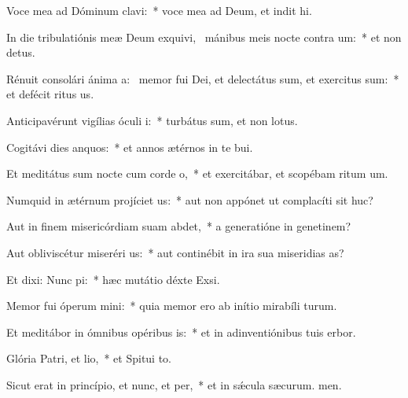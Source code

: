 \item Voce mea ad Dóminum clavi:~* voce mea ad Deum, et indit hi.
\item In die tribulatiónis meæ Deum exquivi,~\pscross{} mánibus meis nocte contra um:~* et non  detus.
\item Rénuit consolári ánima a:~\pscross{} memor fui Dei, et delectátus sum, et exercitus sum:~* et defécit ritus us.
\item Anticipavérunt vigílias óculi i:~* turbátus sum, et non  lotus.
\item Cogitávi dies anquos:~* et annos ætérnos in te bui.
\item Et meditátus sum nocte cum corde o,~* et exercitábar, et scopébam ritum um.
\item Numquid in ætérnum projíciet us:~* aut non appónet ut complacíti sit huc?
\item Aut in finem misericórdiam suam abdet,~* a generatióne in genetinem?
\item Aut obliviscétur miseréri us:~* aut continébit in ira sua miseridias as?
\item Et dixi: Nunc pi:~* hæc mutátio déxte Exsi.
\item Memor fui óperum mini:~* quia memor ero ab inítio mirabíli turum.
\item Et meditábor in ómnibus opéribus is:~* et in adinventiónibus tuis erbor.
\item Glória Patri, et lio,~* et Spitui to.
\item Sicut erat in princípio, et nunc, et per,~* et in sǽcula sæcurum. men.
